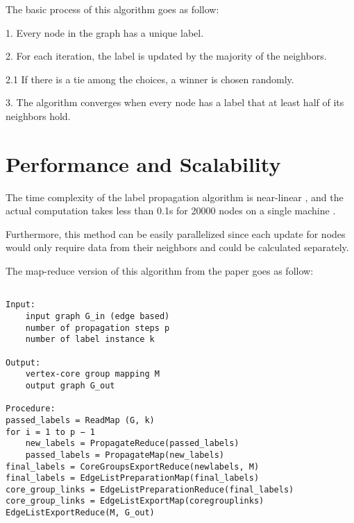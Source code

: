 \documentclass[titlepage]{article}
\begin{document}
The basic process of this algorithm goes as follow:

1. Every node in the graph has a unique label. 

2. For each iteration, the label is updated by the majority of the
neighbors. 

2.1 If there is a tie among the choices, a winner is chosen randomly.

3. The algorithm converges when every node has a label that at least
half of its neighbors hold. 

\section{Performance and Scalability}

The time complexity of the label propagation algorithm is near-linear \cite{3},
and the actual computation takes less than 0.1s for 20000 nodes on a single machine \cite{2}. 

Furthermore, this method can be easily parallelized since 
each update for nodes would only require data from their neighbors
and could be calculated separately.

The map-reduce version of this algorithm from the paper
\cite{4} goes as follow:

\begin{lstlisting}

Input: 
    input graph G_in (edge based)
    number of propagation steps p
    number of label instance k

Output:
    vertex-core group mapping M 
    output graph G_out

Procedure:
passed_labels = ReadMap (G, k)
for i = 1 to p − 1
    new_labels = PropagateReduce(passed_labels)
    passed_labels = PropagateMap(new_labels)
final_labels = CoreGroupsExportReduce(newlabels, M)
final_labels = EdgeListPreparationMap(final_labels)
core_group_links = EdgeListPreparationReduce(final_labels)
core_group_links = EdgeListExportMap(coregrouplinks)
EdgeListExportReduce(M, G_out)

\end{lstlisting}

\printbibliography
\end{document}
